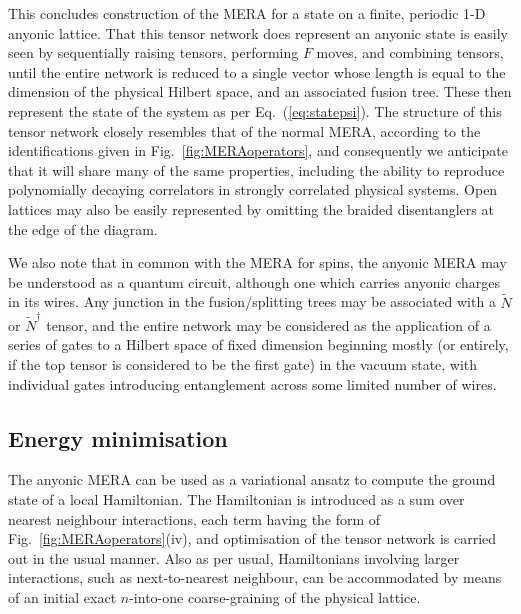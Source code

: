\documentclass[aps,prb,reprint,superscriptaddress,amsfonts,amsmath,amssymb,showpacs,floatfix]{revtex4-1}
\newcommand{\eref}[1]{(\ref{#1})}
\newcommand{\fref}[1]{Fig.~\ref{#1}}
\newcommand{\p}[1]{\phantom{#1}}
\newcommand{\citestop}[1]{.\cite{#1}}
\begin{document}

This concludes construction of the MERA for a state on a finite, periodic {1-D} anyonic lattice. That this tensor network does represent an anyonic state is easily seen by sequentially raising tensors, performing $F$ moves, and combining tensors, until the entire network is reduced to a single vector whose length is equal to the dimension of the physical Hilbert space, and an associated fusion tree. These then represent the state of the system as per Eq.~\eref{eq:statepsi}. The structure of this tensor network closely resembles that of the normal MERA, according to the identifications given in \fref{fig:MERAoperators}, and consequently we anticipate that it will share many of the same properties, including the ability to reproduce polynomially decaying correlators in strongly correlated physical systems.
Open lattices may also be easily represented by omitting the braided disentanglers at the edge of the diagram.

We also note that in common with the MERA for spins, the anyonic MERA may be understood as a quantum circuit, although one which carries anyonic charges in its wires. Any junction in the fusion/splitting trees may be associated with a $\tilde N$ or $\tilde N^\dagger$ tensor, and the entire network may be considered as the application of a series of gates to a Hilbert space of fixed dimension beginning mostly (or entirely, if the top tensor is considered to be the first gate) in the vacuum state, with individual gates introducing entanglement across some limited number of wires.


\subsection{Energy minimisation\label{sec:MERAoptimisation}}

The anyonic MERA can be used as a variational ansatz to compute the ground state of a local Hamiltonian. The Hamiltonian is introduced as a sum over nearest neighbour interactions, each term having the form of \fref{fig:MERAoperators}(iv), and 
optimisation of the tensor network is carried out in the usual manner\citestop{evenbly2009} Also as per usual, Hamiltonians involving larger interactions, such as next-to-nearest neighbour, can be accommodated by means of an initial exact $n$-into-one coarse-graining of the physical lattice.
\end{document}
